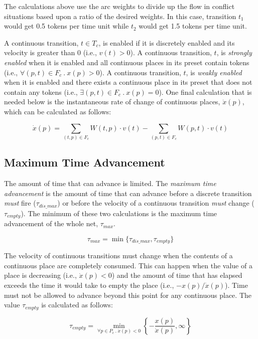 \documentclass[11pt,times]{article}
\begin{document}
The calculations above use the arc weights to divide up
the flow in conflict situations based upon a ratio of the desired weights.  
In this case, transition $t_1$ would get 0.5 tokens per time unit while
$t_2$ would get 1.5 tokens per time unit.

A continuous transition, $t \in T_c$, is enabled if it is discretely enabled
and its velocity is greater than 0 (i.e., $v(t) > 0$).
A continuous transition, $t$, is \emph{strongly enabled} when it is enabled
and all continuous places in its preset contain tokens
(i.e., $\forall (p, t) \in F_c\ .\ x(p) > 0$).
A continuous transition, $t$, is \emph{weakly enabled} when it is enabled
and there exists a continuous place in its preset that does not contain any
tokens (i.e., $\exists (p, t) \in F_c\ .\ x(p) = 0$). 
One final calculation that is needed below is the instantaneous rate 
of change of continuous places, $\dot{x}(p)$, which can be calculated as 
follows:

\[\dot{x}(p) = \sum_{(t, p) \in F_c} W(t, p) \cdot v(t) -
               \sum_{(p, t) \in F_c} W(p, t) \cdot v(t)\]

\subsection{Maximum Time Advancement}

The amount of time that can advance is limited.
The {\em maximum time advancement} is the amount of time that can advance
before a discrete transition \emph{must} fire ($\tau_{dis\_max}$) or before the
velocity of a continuous transition \emph{must} change ($\tau_{empty}$).
The minimum of these two calculations is the maximum time advancement
of the whole net, $\tau_{max}$.  

\[ \tau_{max} = \min \{ \tau_{dis\_max}, \tau_{empty} \}\]

The velocity of continuous transitions must change when the contents of a
continuous place are completely consumed.  This can happen when the value of
a place is decreasing (i.e., $\dot{x}(p) < 0$) and the amount of time that 
has elapsed exceeds the time it would take to empty the place 
(i.e., $-x(p)/\dot{x}(p)$).  Time must not be allowed to advance beyond this
point for any continuous place.  The value $\tau_{empty}$ is calculated as 
follows:

\[ \tau_{empty} = \min_{\forall p \in P_c\ .\ \dot{x}(p) < 0} \left\{-
  \frac{x(p)}{\dot{x}(p)}, \infty \right\}\]
\end{document}
